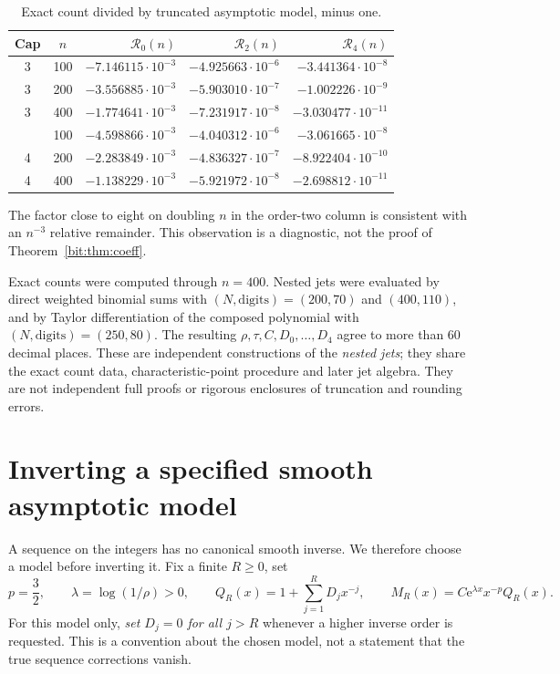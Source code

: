 \documentclass[11pt]{article}
\theoremstyle{definition}\newtheorem{definition}[theorem]{Definition}
\theoremstyle{remark}\newtheorem{remark}[theorem]{Remark}
\newcommand{\ee}{\mathrm e}
\begin{document}
\begin{table}[htbp]
\centering
\begin{tabular}{@{}ccrrr@{}}
\toprule
Cap & $n$ & $\mathcal R_0(n)$ & $\mathcal R_2(n)$ & $\mathcal R_4(n)$\\
\midrule
3 & 100 & $-7.146115\cdot10^{-3}$ & $-4.925663\cdot10^{-6}$ & $-3.441364\cdot10^{-8}$\\
3 & 200 & $-3.556885\cdot10^{-3}$ & $-5.903010\cdot10^{-7}$ & $-1.002226\cdot10^{-9}$\\
3 & 400 & $-1.774641\cdot10^{-3}$ & $-7.231917\cdot10^{-8}$ & $-3.030477\cdot10^{-11}$\\
\addlinespace
4 & 100 & $-4.598866\cdot10^{-3}$ & $-4.040312\cdot10^{-6}$ & $-3.061665\cdot10^{-8}$\\
4 & 200 & $-2.283849\cdot10^{-3}$ & $-4.836327\cdot10^{-7}$ & $-8.922404\cdot10^{-10}$\\
4 & 400 & $-1.138229\cdot10^{-3}$ & $-5.921972\cdot10^{-8}$ & $-2.698812\cdot10^{-11}$\\
\bottomrule
\end{tabular}
\caption{Exact count divided by truncated asymptotic model, minus one.}
\label{bit:tab:residuals}
\end{table}

The factor close to eight on doubling $n$ in the order-two column is consistent with an $n^{-3}$ relative remainder. This observation is a diagnostic, not the proof of Theorem~\ref{bit:thm:coeff}.

Exact counts were computed through $n=400$. Nested jets were evaluated by direct weighted binomial sums with $(N,\mathrm{digits})=(200,70)$ and $(400,110)$, and by Taylor differentiation of the composed polynomial with $(N,\mathrm{digits})=(250,80)$. The resulting $\rho,\tau,C,D_0,\ldots,D_4$ agree to more than 60 decimal places. These are independent constructions of the \emph{nested jets}; they share the exact count data, characteristic-point procedure and later jet algebra. They are not independent full proofs or rigorous enclosures of truncation and rounding errors.

\section{Inverting a specified smooth asymptotic model}
\label{bit:sec:inverse}
A sequence on the integers has no canonical smooth inverse. We therefore choose a model before inverting it. Fix a finite $R\ge0$, set
\begin{equation}
 p=\frac32,\qquad\lambda=\log(1/\rho)>0,\qquad
 Q_R(x)=1+\sum_{j=1}^R D_jx^{-j},\qquad
 M_R(x)=C\ee^{\lambda x}x^{-p}Q_R(x).
 \label{bit:eq:model}
\end{equation}
For this model only, \emph{set $D_j=0$ for all $j>R$} whenever a higher inverse order is requested. This is a convention about the chosen model, not a statement that the true sequence corrections vanish.
\end{document}
